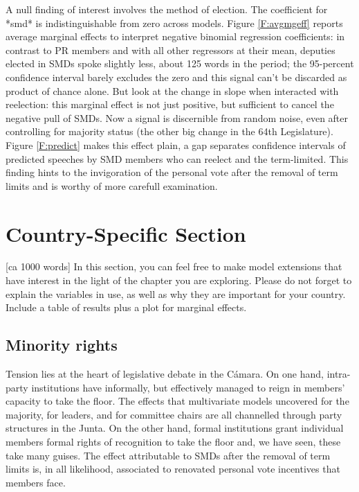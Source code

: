 \documentclass[letter,12pt]{article}
\begin{document}
A null finding of interest involves the method of election. The coefficient for *smd* is indistinguishable from zero across models. Figure \ref{F:avgmgeff} reports average marginal effects to interpret negative binomial regression coefficients: in contrast to PR members and with all other regressors at their mean, deputies elected in SMDs spoke slightly less, about 125 words in the period; the 95-percent confidence interval barely excludes the zero and this signal can't be discarded as product of chance alone. But look at the change in slope when interacted with reelection: this marginal effect is not just positive, but sufficient to cancel the negative pull of SMDs. Now a signal is discernible from random noise, even after controlling for majority status (the other big change in the 64th Legislature). Figure \ref{F:predict} makes this effect plain, a gap separates confidence intervals of predicted speeches by SMD members who can reelect and the term-limited. This finding hints to the invigoration of the personal vote after the removal of term limits and is worthy of more carefull examination. 

\section{Country-Specific Section} [ca 1000 words]
In this section, you can feel free to make model extensions that have interest in the light of the chapter you are exploring. Please do not forget to explain the variables in use, as well as why they are important for your country. Include a table of results plus a plot for marginal effects. 

  \subsection{Minority rights}

Tension lies at the heart of legislative debate in the Cámara. On one hand, intra-party institutions have informally, but effectively managed to reign in members' capacity to take the floor. The effects that multivariate models uncovered for the majority, for leaders, and for committee chairs are all channelled through party structures in the Junta. On the other hand, formal institutions grant individual members formal rights of recognition to take the floor and, we have seen, these take many guises. The effect attributable to SMDs after the removal of term limits is, in all likelihood, associated to renovated personal vote incentives that members face. 
\end{document}
